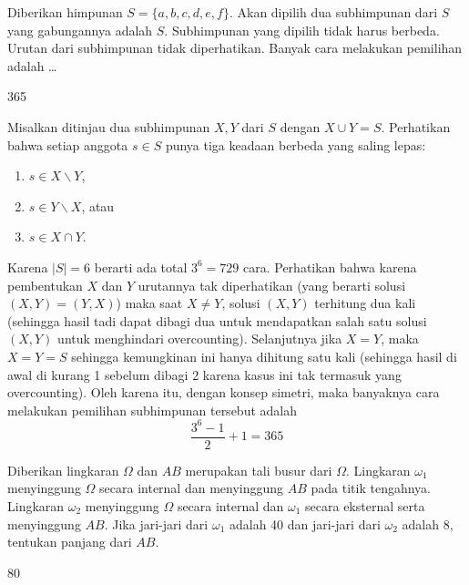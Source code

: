 \begin{soalbaru}
Diberikan himpunan $S = \{a,b,c,d,e,f\}$. Akan dipilih dua subhimpunan dari $S$ yang gabungannya adalah $S$. Subhimpunan yang dipilih tidak harus berbeda. Urutan dari subhimpunan tidak diperhatikan. Banyak cara melakukan pemilihan adalah \dots
\end{soalbaru}
\begin{jawaban}
365
\end{jawaban}
\begin{solusi}
Misalkan ditinjau dua subhimpunan $X,Y$ dari $S$ dengan $X \cup Y = S$. Perhatikan bahwa setiap anggota $s \in S$ punya tiga keadaan berbeda yang saling lepas: 
\begin{enumerate}[1)]
\item $s \in X \backslash Y$,
\item $s \in Y \backslash X$, atau
\item $s \in  X \cap Y$. 
\end{enumerate}
Karena $|S| = 6$ berarti ada total $3^6 = 729$ cara. Perhatikan bahwa karena pembentukan $X$ dan $Y$ urutannya tak diperhatikan (yang berarti solusi $(X,Y)=(Y,X)$) maka saat $X \neq Y$, solusi $(X,Y)$ terhitung dua kali (sehingga hasil tadi dapat dibagi dua untuk mendapatkan salah satu solusi $(X,Y)$ untuk menghindari overcounting). Selanjutnya jika $X=Y$, maka $X=Y=S$ sehingga kemungkinan ini hanya dihitung satu kali (sehingga hasil di awal di kurang 1 sebelum dibagi 2 karena kasus ini tak termasuk yang overcounting). Oleh karena itu, dengan konsep simetri, maka banyaknya cara melakukan pemilihan subhimpunan tersebut adalah
$$\dfrac{3^6-1}{2}+1 = \boxed{365}$$
\end{solusi}

\begin{soalbaru}
Diberikan lingkaran $\Omega$ dan $AB$ merupakan tali busur dari $\Omega$. Lingkaran $\omega_1$ menyinggung $\Omega$ secara internal dan menyinggung $AB$ pada titik tengahnya. Lingkaran $\omega_2$ menyinggung $\Omega$ secara internal dan $\omega_1$ secara eksternal serta menyinggung $AB$. Jika jari-jari dari $\omega_1$ adalah 40 dan jari-jari dari $\omega_2$ adalah 8, tentukan panjang dari $AB$.
\begin{center}
\end{center}
\end{soalbaru}
\begin{jawaban}
80
\end{jawaban}

